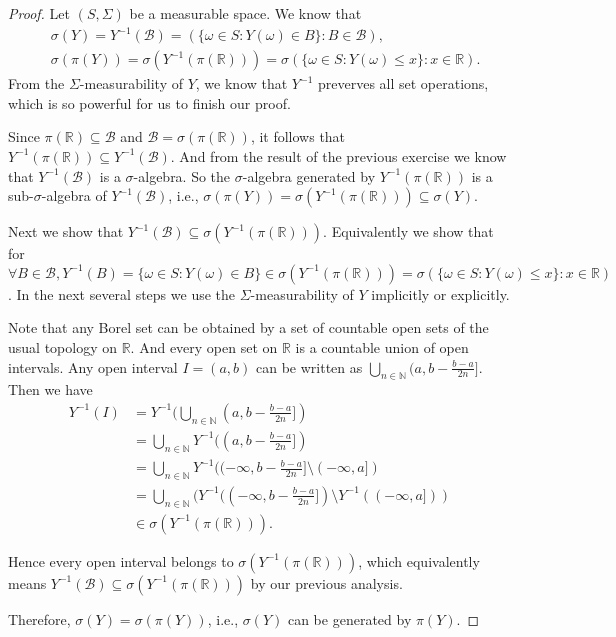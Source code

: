\documentclass[a4paper, linespread=1.5]{article}
\newcommand{\Natural}{\mathbb{N}}
\newcommand{\Real}{\mathbb{R}}
\newcommand{\BorelSet}{\mathcal{B}}
\begin{document}
    \begin{proof}
        Let $(S, \Sigma)$ be a measurable space. We know that
        \begin{align*}
            &\sigma(Y) = Y^{-1}(\BorelSet) = (\{\omega \in S \colon Y(\omega) \in B\} \colon B \in \BorelSet), \\
            &\sigma(\pi(Y)) = \sigma(Y^{-1}(\pi(\Real))) = \sigma(\{\omega \in S \colon Y(\omega) \leqslant x\} \colon x \in \Real).
        \end{align*}
        From the $\Sigma$-measurability of $Y$, we know that $Y^{-1}$ preverves all set operations, which is so powerful for us to finish our proof.
        
        Since $\pi(\Real) \subseteq \BorelSet$ and $\BorelSet = \sigma(\pi(\Real))$, it follows that $Y^{-1}(\pi(\Real)) \subseteq Y^{-1}(\BorelSet)$. And from the result of the previous exercise we know that $Y^{-1}(\BorelSet)$ is a $\sigma$-algebra. So the $\sigma$-algebra generated by $Y^{-1}(\pi(\Real))$ is a sub-$\sigma$-algebra of $Y^{-1}(\BorelSet)$, i.e., $\sigma(\pi(Y)) = \sigma(Y^{-1}(\pi(\Real))) \subseteq \sigma(Y)$.
        
        Next we show that $Y^{-1}(\BorelSet) \subseteq \sigma(Y^{-1}(\pi(\Real)))$. Equivalently we show that for $\forall B \in \BorelSet, Y^{-1}(B) = \{\omega \in S \colon Y(\omega) \in B\} \in \sigma(Y^{-1}(\pi(\Real))) = \sigma(\{\omega \in S \colon Y(\omega) \leqslant x\} \colon x \in \Real)$. In the next several steps we use the $\Sigma$-measurability of $Y$ implicitly or explicitly.
        
        Note that any Borel set can be obtained by a set of countable open sets of the usual topology on $\Real$. And every open set on $\Real$ is a countable union of open intervals. Any open interval $I = (a, b)$ can be written as $\bigcup_{n \in \Natural}(a, b - \frac{b - a}{2n}]$. Then we have
        \begin{align*}
            Y^{-1}(I) &= Y^{-1}(\bigcup_{n \in \Natural}(a, b - \frac{b - a}{2n}]) \\
            &= \bigcup_{n \in \Natural} Y^{-1}((a, b - \frac{b - a}{2n}]) \\
            &= \bigcup_{n \in \Natural} Y^{-1}((-\infty, b - \frac{b - a}{2n}] \setminus (-\infty, a]) \\
            &= \bigcup_{n \in \Natural} (Y^{-1}((-\infty, b - \frac{b - a}{2n}]) \setminus Y^{-1}((-\infty, a])) \\
            &\in \sigma(Y^{-1}(\pi(\Real))).
        \end{align*}
        
        Hence every open interval belongs to $\sigma(Y^{-1}(\pi(\Real)))$, which equivalently means $Y^{-1}(\BorelSet) \subseteq \sigma(Y^{-1}(\pi(\Real)))$ by our previous analysis.
        
        Therefore, $\sigma(Y) = \sigma(\pi(Y))$, i.e., $\sigma(Y)$ can be generated by $\pi(Y)$.
    \end{proof}
\end{document}
